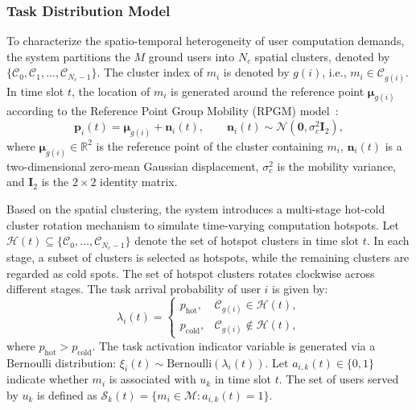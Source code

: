 \documentclass[journal]{IEEEtran}
\begin{document}
\subsubsection{Task Distribution Model}
To characterize the spatio-temporal heterogeneity of user computation demands, the system partitions the $M$ ground users into $N_c$ spatial clusters, denoted
by $\{\mathcal{C}_0,\mathcal{C}_1,\ldots,\mathcal{C}_{N_c-1}\}$. The cluster
index of $m_i$ is denoted by $g(i)$, i.e., $m_i\in\mathcal{C}_{g(i)}$. In time
slot $t$, the location of $m_i$ is generated around the reference point
$\bm{\mu}_{g(i)}$ according to the Reference Point Group Mobility (RPGM)
model~\cite{hong1999group_rpgm}:
\begin{equation}\label{eq:rpgm}
\bm{p}_i(t) = \bm{\mu}_{g(i)} + \bm{n}_i(t),\qquad
\bm{n}_i(t)\sim\mathcal{N}(\bm{0},\sigma_c^{2}\bm{I}_2),
\end{equation}
where $\bm{\mu}_{g(i)}\in\mathbb{R}^{2}$ is the reference point of the cluster
containing $m_i$, $\bm{n}_i(t)$ is a two-dimensional zero-mean Gaussian
displacement, $\sigma_c^{2}$ is the mobility variance, and $\bm{I}_2$ is the
$2\times 2$ identity matrix.


Based on the spatial clustering, the system introduces a multi-stage hot-cold cluster rotation mechanism to simulate time-varying computation hotspots. Let $\mathcal{H}(t)\subseteq\{\mathcal{C}_0,\ldots,\mathcal{C}_{N_c-1}\}$ denote the set of hotspot  clusters in time slot $t$. In each stage, a subset of clusters is selected as hotspots, while the remaining
clusters are regarded as cold spots. The set of hotspot clusters rotates clockwise across different stages. The task arrival probability of user $i$ is given by:
\begin{equation}
\lambda_i(t)=
\begin{cases}
p_{\mathrm{hot}}, & \mathcal{C}_{g(i)}\in\mathcal{H}(t),\\[2pt]
p_{\mathrm{cold}}, & \mathcal{C}_{g(i)}\notin\mathcal{H}(t),
\end{cases}
\end{equation}
where $p_{\mathrm{hot}} > p_{\mathrm{cold}}$. The task activation indicator variable is generated via a Bernoulli distribution: $\xi_i(t) \sim \mathrm{Bernoulli}(\lambda_i(t))$. Let $a_{i,k}(t)\in\{0,1\}$ indicate whether $m_i$ is associated with $u_k$ in
time slot $t$. The set of users served by $u_k$ is defined as
$\mathcal{S}_k(t)=\{m_i\in\mathcal{M}: a_{i,k}(t)=1\}$.
\end{document}

